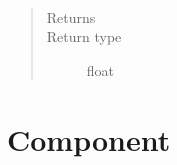 \documentclass[letterpaper,10pt,english]{sphinxmanual}
\begin{document}
\begin{fulllineitems}

\begin{fulllineitems}
\label{\detokenize{Reference:salabim.Weibull.sample}}~\begin{quote}\begin{description}
\item[{Returns}] \leavevmode
{}

\item[{Return type}] \leavevmode
float

\end{description}\end{quote}

\end{fulllineitems}


\end{fulllineitems}



\section{Component}
\label{\detokenize{Reference:component}}
\end{document}

